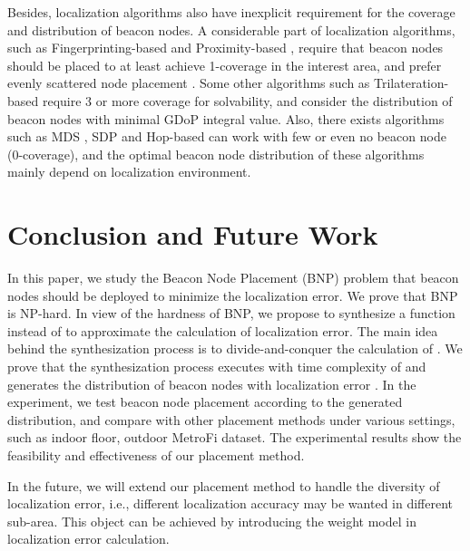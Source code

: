 \documentclass[10pt, conference, letterpaper]{IEEEtran}
\begin{document}
Besides, localization algorithms also have inexplicit requirement for the coverage and distribution of beacon nodes. A considerable part of localization algorithms, such as Fingerprinting-based \cite{RADAR00}\cite{Fingerprinting04}\cite{Fingerprinting12} and Proximity-based \cite{Proximity08}\cite{Proximity03}, require that beacon nodes should be placed to at least achieve 1-coverage in the interest area, and prefer evenly scattered node placement . Some other algorithms such as Trilateration-based \cite{Trilateration01}\cite{Trilateration04} require 3 or more coverage for solvability, and consider the distribution of beacon nodes with minimal GDoP integral value. Also, there exists algorithms such as MDS \cite{MDS03}\cite{MDS04}, SDP \cite{SDP01} and Hop-based \cite{Hop07}\cite{Hop05}\cite{Hop03} can work with few or even no beacon node (0-coverage), and the optimal beacon node distribution of these algorithms mainly depend on localization environment.

\section{Conclusion and Future Work} \label{conclusion}
In this paper, we study the Beacon Node Placement (BNP) problem that beacon nodes should be deployed to minimize the localization error. We prove that BNP is NP-hard. In view of the hardness of BNP, we propose to synthesize a function  instead of  to approximate the calculation of localization error. The main idea behind the synthesization process is to divide-and-conquer the calculation of . We prove that the synthesization process executes with time complexity of  and generates the distribution of beacon nodes with localization error . In the experiment, we test beacon node placement according to the generated distribution, and compare with other placement methods under various settings, such as  indoor floor, outdoor MetroFi dataset. The experimental results show the feasibility and effectiveness of our placement method.

In the future, we will extend our placement method to handle the diversity of localization error, i.e., different localization accuracy may be wanted in different sub-area. This object can be achieved by introducing the weight model in localization error calculation.
\end{document}
